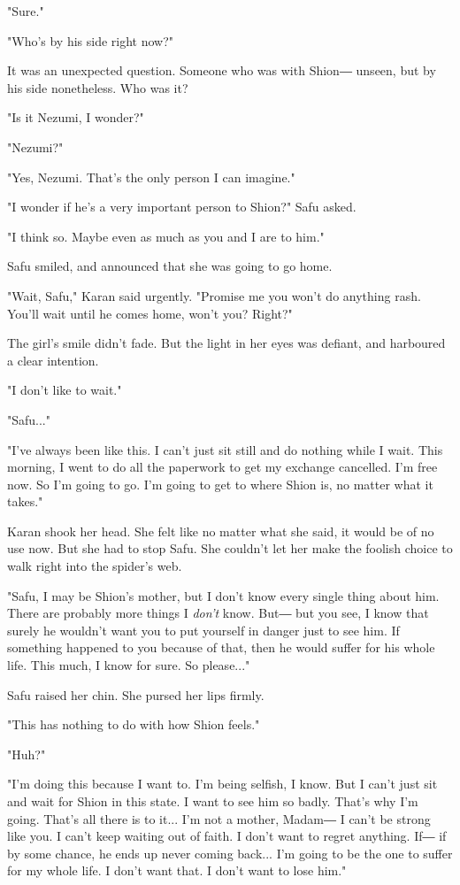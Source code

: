 "Sure."

"Who's by his side right now?"

It was an unexpected question. Someone who was with Shion― unseen, but
by his side nonetheless. Who was it?

"Is it Nezumi, I wonder?"

"Nezumi?"

"Yes, Nezumi. That's the only person I can imagine."

"I wonder if he's a very important person to Shion?" Safu asked.

"I think so. Maybe even as much as you and I are to him."

Safu smiled, and announced that she was going to go home.

"Wait, Safu," Karan said urgently. "Promise me you won't do anything
rash. You'll wait until he comes home, won't you? Right?"

The girl's smile didn't fade. But the light in her eyes was defiant, and
harboured a clear intention.

"I don't like to wait."

"Safu..."

"I've always been like this. I can't just sit still and do nothing while
I wait. This morning, I went to do all the paperwork to get my exchange
cancelled. I'm free now. So I'm going to go. I'm going to get to where
Shion is, no matter what it takes."

Karan shook her head. She felt like no matter what she said, it would be
of no use now. But she had to stop Safu. She couldn't let her make the
foolish choice to walk right into the spider's web.

"Safu, I may be Shion's mother, but I don't know every single thing
about him. There are probably more things I \emph{don't} know. But― but you
see, I know that surely he wouldn't want you to put yourself in danger
just to see him. If something happened to you because of that, then he
would suffer for his whole life. This much, I know for sure. So
please..."

Safu raised her chin. She pursed her lips firmly.

"This has nothing to do with how Shion feels."

"Huh?"

"I'm doing this because I want to. I'm being selfish, I know. But I
can't just sit and wait for Shion in this state. I want to see him so
badly. That's why I'm going. That's all there is to it... I'm not a
mother, Madam― I can't be strong like you. I can't keep waiting out of
faith. I don't want to regret anything. If― if by some chance, he ends
up never coming back... I'm going to be the one to suffer for my whole
life. I don't want that. I don't want to lose him."

